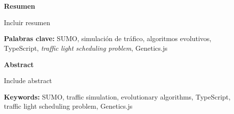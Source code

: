 \chapter*{}
\begin{center}
    \textbf{Resumen}
\end{center}

Incluir resumen

\medskip

\noindent \textbf{Palabras clave:} SUMO, simulación de tráfico, algoritmos evolutivos, TypeScript, \textit{traffic light scheduling problem}, Genetics.js

\bigskip
\bigskip

\begin{center}
    \textbf{Abstract}
\end{center}

Include abstract

\medskip

\noindent \textbf{Keywords:} SUMO, traffic simulation, evolutionary algorithms, TypeScript, traffic light scheduling problem, Genetics.js

